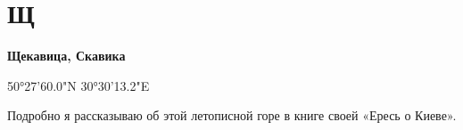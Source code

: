 \chapter*{Щ}

\textbf{Щекавица, Скавика}

50°27'60.0"N 30°30'13.2"E

Подробно я рассказываю об этой летописной горе в книге своей «Ересь о Киеве».
